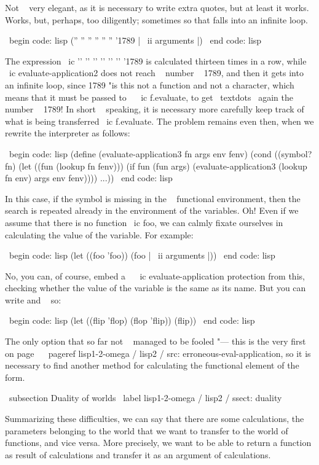 Not ~ very elegant, as it is necessary to write extra quotes, but at least
it works. Works, but, perhaps, too diligently; sometimes so that
falls into an infinite loop.

\ begin {code: lisp}
('' '' '' '' '' '' '1789 | \ ii {arguments} |)
\ end {code: lisp}

The expression \ ic {'{}' {} '{}' {} '{}' {} '{}' {} '{}' {} '{}' {} '1789}
is calculated thirteen times in a row, while \ ic {evaluate-application2} does not reach ~
number ~ 1789, and then it gets into an infinite loop, since 1789 "is this
not a function and not a character, which means that it must be passed to ~ \ ic {f.evaluate},
to get \ textdots \ again the number ~ 1789! In short ~ speaking, it is necessary more carefully
keep track of what is being transferred \ ic {f.evaluate}. The problem remains even then,
when we rewrite the interpreter as follows:

\ begin {code: lisp}
(define (evaluate-application3 fn args env fenv)
  (cond
    ((symbol? fn)
     (let ((fun (lookup fn fenv)))
       (if fun (fun args)
           (evaluate-application3 (lookup fn env) args env fenv))))
    ...))
\ end {code: lisp}

In this case, if the symbol is missing in the ~ functional environment, then the search
is repeated already in the environment of the variables. Oh! Even if we assume that
there is no function \ ic {foo}, we can calmly fixate ourselves in calculating
the value of the variable. For example:

\ begin {code: lisp}
(let ((foo 'foo))
  (foo | \ ii {arguments} |))
\ end {code: lisp}

No, you can, of course, embed a ~ \ ic {evaluate-application} protection from this,
checking whether the value of the variable is the same as its name. But you can write
and ~ so:

\ begin {code: lisp}
(let ((flip 'flop)
      (flop 'flip))
  (flip))
\ end {code: lisp}

The only option that so far not ~ managed to be fooled "--- this is the very first on
page ~ \ pageref {lisp1-2-omega / lisp2 / src: erroneous-eval-application}, so
it is necessary to find another method for calculating the functional element of the form.


\ subsection {Duality of worlds} \ label {lisp1-2-omega / lisp2 / ssect: duality}

Summarizing these difficulties, we can say that there are some calculations,
the parameters belonging to the world that we want to transfer to the world of functions,
and vice versa. More precisely, we want to be able to return a function as
result of calculations and transfer it as an argument of calculations.

